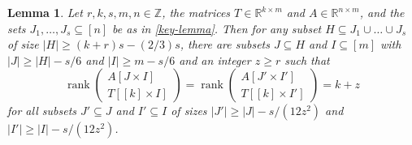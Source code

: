 \documentclass[english]{article}
\newtheorem{lemma}[theorem]{Lemma}
\theoremstyle{remark}
\numberwithin{equation}{section}
\numberwithin{figure}{section}
\newcommand{\su}{\subseteq}
\newcommand{\RR}{\mathbb{R}}
\newcommand{\on}{\operatorname}
\begin{document}
\begin{lemma}\label{lem:drop-robust}
Let $r,k,s,m,n\in \mathbb{Z}$, the matrices $T\in \RR^{k\times m}$ and $A\in \RR^{n\times m}$, and the sets $J_1,\dots,J_s\su [n]$ be as in \cref{key-lemma}. Then for any subset $H\su J_1\cup\dots\cup J_s$ of size $|H|\ge (k+r)s-(2/3)s$, there are subsets $J\subseteq H$ and $I\subseteq [m]$ with $|J|\ge |H|-s/6$ and $|I|\ge m-s/6$ and an integer $z\ge r$ such that
\begin{equation}\label{eq:drop-robust-lemma}
\on{rank}\begin{pmatrix}A[J\times I]\\ T[[k]\times I]\end{pmatrix}=\on{rank}\begin{pmatrix}A[J'\times I']\\ T[[k]\times I']\end{pmatrix}=k+z
\end{equation}
for all subsets $J'\su J$ and $I'\su I$ of sizes $|J'|\ge |J|-s/(12z^2)$ and $|I'|\ge |I|-s/(12z^2)$.
\end{lemma}
\end{document}
